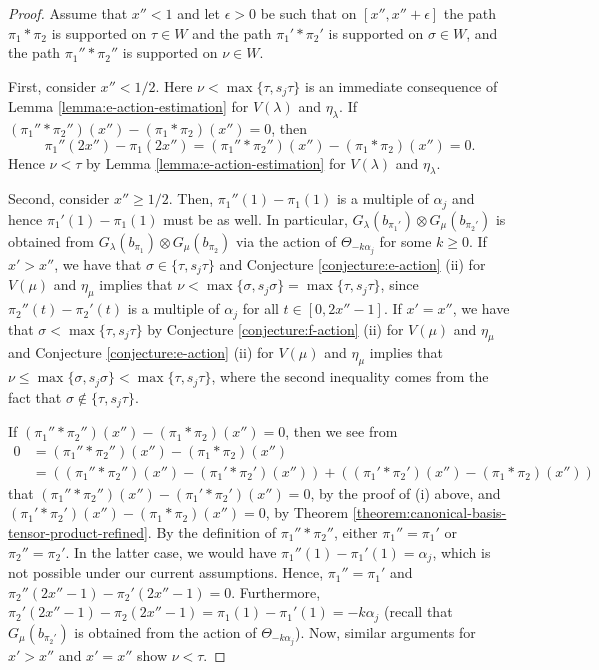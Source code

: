 \documentclass[final]{amsart}
\theoremstyle{plain}
\theoremstyle{definition}
\begin{document}
\begin{proof}
    Assume that $x'' < 1$ and let $\epsilon > 0$ be such that on $[x'', x''+\epsilon]$ the path $\pi_1*\pi_2$ is supported on $\tau \in W$ and the path $\pi_1'*\pi_2'$ is supported on $\sigma \in W$, and the path $\pi_1''*\pi_2''$ is supported on $\nu \in W$.

    First, consider $x'' < 1/2$.
    Here $\nu < \max\{\tau, s_j\tau\}$ is an immediate consequence of Lemma \ref{lemma:e-action-estimation} for $V(\lambda)$ and $\eta_\lambda$.
    If $(\pi_1''*\pi_2'')(x'') - (\pi_1*\pi_2)(x'') = 0$, then
    \[
        \pi_1''(2x'') - \pi_1(2x'') = (\pi_1''*\pi_2'')(x'') - (\pi_1*\pi_2)(x'') = 0.
    \]
    Hence $\nu < \tau$ by Lemma \ref{lemma:e-action-estimation} for $V(\lambda)$ and $\eta_\lambda$.

    Second, consider $x'' \ge 1/2$.
    Then, $\pi_1''(1) - \pi_1(1)$ is a multiple of $\alpha_j$ and hence $\pi_1'(1) - \pi_1(1)$ must be as well.
    In particular, $G_\lambda(b_{\pi_1'}) \otimes G_\mu(b_{\pi_2'})$ is obtained from $G_\lambda(b_{\pi_1}) \otimes G_\mu(b_{\pi_2})$ via the action of $\Theta_{-k\alpha_j}$ for some $k \ge 0$.
    If $x' > x''$, we have that $\sigma \in \{\tau, s_j\tau\}$ and Conjecture \ref{conjecture:e-action} (ii) for $V(\mu)$ and $\eta_\mu$ implies that $\nu < \max\{\sigma, s_j\sigma\} = \max\{\tau, s_j\tau\}$, since $\pi_2''(t) - \pi_2'(t)$ is a multiple of $\alpha_j$ for all $t \in [0, 2x''-1]$.
    If $x' = x''$, we have that $\sigma < \max\{\tau, s_j\tau\}$ by Conjecture \ref{conjecture:f-action} (ii) for $V(\mu)$ and $\eta_\mu$ and Conjecture \ref{conjecture:e-action} (ii) for $V(\mu)$ and $\eta_\mu$ implies that $\nu \le \max\{\sigma, s_j\sigma\} < \max\{\tau, s_j\tau\}$, where the second inequality comes from the fact that $\sigma \notin \{\tau, s_j\tau\}$.

    If $(\pi_1''*\pi_2'')(x'') - (\pi_1*\pi_2)(x'') = 0$, then we see from
    \begin{align*}
        0
        &= (\pi_1''*\pi_2'')(x'') - (\pi_1*\pi_2)(x'') \\
        &= ((\pi_1''*\pi_2'')(x'') - (\pi_1'*\pi_2')(x'')) + ((\pi_1'*\pi_2')(x'') - (\pi_1*\pi_2)(x''))
    \end{align*}
    that $(\pi_1''*\pi_2'')(x'') - (\pi_1'*\pi_2')(x'') = 0$, by the proof of (i) above, and $(\pi_1'*\pi_2')(x'') - (\pi_1*\pi_2)(x'') = 0$, by Theorem \ref{theorem:canonical-basis-tensor-product-refined}.
    By the definition of $\pi_1''*\pi_2''$, either $\pi_1'' = \pi_1'$ or $\pi_2'' = \pi_2'$.
    In the latter case, we would have $\pi_1''(1) - \pi_1'(1) = \alpha_j$, which is not possible under our current assumptions.
    Hence, $\pi_1'' = \pi_1'$ and $\pi_2''(2x''-1) - \pi_2'(2x''-1) = 0$.
    Furthermore, $\pi_2'(2x''-1)- \pi_2(2x''-1) = \pi_1(1) - \pi_1'(1) = -k\alpha_j$ (recall that $G_\mu(b_{\pi_2'})$ is obtained from the action of $\Theta_{-k\alpha_j}$).
    Now, similar arguments for $x' > x''$ and $x' = x''$ show $\nu < \tau$.
\end{proof}
\end{document}
